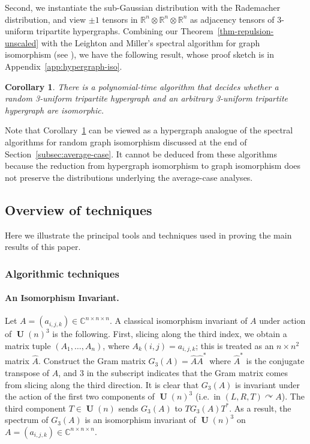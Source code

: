\documentclass[11pt]{article}
\numberwithin{equation}{section}
\newtheorem{corollary}{Corollary}[section]
\theoremstyle{remark}
\DeclareMathOperator{\Unitary}{\textbf{U}}
\newcommand{\CC}{\mathbb{C}}
\newcommand{\RR}{\mathbb{R}}
\begin{document}
Second, we instantiate the sub-Gaussian distribution with the Rademacher distribution, and view $\pm 1$ tensors in $\RR^n\otimes \RR^n\otimes \RR^n$ as adjacency tensors of 3-uniform tripartite hypergraphs. Combining our Theorem~\ref{thm-repulsion-unscaled} with the Leighton and Miller's spectral algorithm for graph isomorphism \cite{leighton1979certificates} (see \cite{spielman2018testing}), we have the following result, whose proof sketch is in Appendix~\ref{app:hypergraph-iso}.  

\begin{corollary}\label{cor:hypergraph-iso}
    There is a polynomial-time algorithm that decides whether a random 3-uniform tripartite hypergraph and an arbitrary 3-uniform tripartite hypergraph are isomorphic.
\end{corollary}

Note that Corollary~\ref{cor:hypergraph-iso} can be viewed as a hypergraph analogue of the spectral algorithms for random graph isomorphism discussed at the end of Section~\ref{subsec:average-case}. It cannot be deduced from these algorithms because the reduction from hypergraph isomorphism to graph isomorphism \cite{KoblerEtAl1993} does not preserve the distributions underlying the average-case analyses.


\subsection{Overview of techniques}\label{subsec:techniques}

Here we illustrate the principal tools and techniques used in proving the main results of this paper. 

\subsubsection{Algorithmic techniques}

\paragraph{An Isomorphism Invariant.} Let $A=(a_{i,j,k})\in \CC^{n\times n\times n}$. A classical isomorphism invariant of $A$ under action of $\Unitary(n)^3$ is the following. First, slicing along the third index, we obtain a matrix tuple $(A_1, \dots, A_n)$, where $A_k(i, j)=a_{i,j,k}$; this is treated as an $n \times n^2$ matrix $\hat{A}$. Construct the Gram matrix $G_3(A)=\hat{A}\hat{A}^*$ where $\hat{A}^*$ is the conjugate transpose of $\hat{A}$, and $3$ in the subscript indicates that the Gram matrix comes from slicing along the third direction. It is clear that $G_3(A)$ is invariant under the action of the first two components of $\Unitary(n)^3$ (i.e.\ in $(L, R, T) \curvearrowright A$). The third component $T\in \Unitary(n)$ sends $G_3(A)$ to $TG_3(A)T^*$. As a result, the spectrum of $G_3(A)$ is an isomorphism invariant of $\Unitary(n)^3$ on $A=(a_{i,j,k})\in \CC^{n\times n\times n}$.
\end{document}

